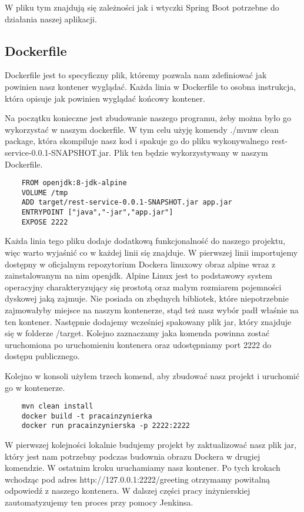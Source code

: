 W pliku tym znajdują się zależności jak i wtyczki Spring Boot potrzebne do działania naszej aplikacji. 

\subsection{Dockerfile} 

Dockerfile jest to specyficzny plik, któremy pozwala nam zdefiniować jak powinien nasz kontener wyglądać. Każda linia w Dockerfile to osobna instrukcja, która opisuje jak powinien wyglądać końcowy kontener. 

Na początku konieczne jest zbudowanie naszego programu, żeby można było go wykorzystać w naszym dockerfile. W tym celu użyję komendy ./mvnw clean package, która skompiluje nasz kod i spakuje go do pliku wykonywalnego rest-service-0.0.1-SNAPSHOT.jar. Plik ten będzie wykorzystywany w naszym Dockerfile. 

\begin{lstlisting}
    FROM openjdk:8-jdk-alpine
    VOLUME /tmp
    ADD target/rest-service-0.0.1-SNAPSHOT.jar app.jar
    ENTRYPOINT ["java","-jar","app.jar"]
    EXPOSE 2222
\end{lstlisting}


Każda linia tego pliku dodaje dodatkową funkcjonalność do naszego projektu, więc warto wyjaśnić co w każdej linii się znajduje. W pierwszej linii importujemy dostępny w oficjalnym repozytorium Dockera linuxowy obraz alpine wraz z zainstalowanym na nim openjdk. Alpine Linux jest to podstawowy system operacyjny charakteryzujący się prostotą oraz małym rozmiarem pojemności dyskowej jaką zajmuje. Nie posiada on zbędnych bibliotek, które niepotrzebnie zajmowałyby miejsce na naszym kontenerze, stąd też nasz wybór padł właśnie na ten kontener. Następnie dodajemy wcześniej spakowany plik jar, który znajduje się w folderze /target. Kolejno zaznaczamy jaka komenda powinna zostać uruchomiona po uruchomieniu kontenera oraz udostępniamy port 2222 do dostępu publicznego. 

Kolejno w konsoli użyłem trzech komend, aby zbudować nasz projekt i uruchomić go w kontenerze. 
\begin{lstlisting}
    mvn clean install 
    docker build -t pracainzynierka
    docker run pracainzynierska -p 2222:2222
\end{lstlisting}
W pierwszej kolejności lokalnie budujemy projekt by zaktualizować nasz plik jar, który jest nam potrzebny podczas budownia obrazu Dockera w drugiej komendzie. W ostatnim kroku uruchamiamy nasz kontener. Po tych krokach wchodząc pod adres http://127.0.0.1:2222/greeting otrzymamy powitalną odpowiedź z naszego kontenera. 
W dalszej części pracy inżynierskiej zautomatyzujemy ten proces przy pomocy Jenkinsa. 

